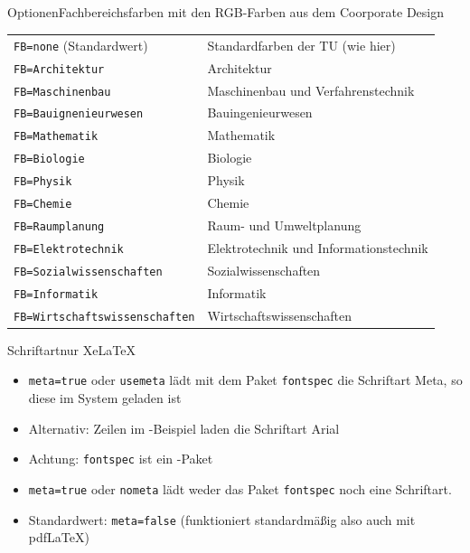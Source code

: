 \documentclass[german,10pt,xcolor=colortbl,compress
]{beamer}
\begin{document}
	\subsection*{}
	\begin{frame}{Optionen}{Fachbereichsfarben mit den RGB-Farben aus dem Coorporate Design}
				\begin{tabular}{ll}
					\toprule
					\lstinline|FB=none| (Standardwert)& Standardfarben der TU (wie hier)\\
					\lstinline|FB=Architektur| & \colorbox{tuklarchitektur}{\color{white}Architektur}\\
					\lstinline|FB=Maschinenbau| & \colorbox{tuklmaschinenbau}{\color{white}Maschinenbau und Verfahrenstechnik}\\
					\lstinline|FB=Bauignenieurwesen| & \colorbox{tuklbauingenieurwesen}{\color{white}Bauingenieurwesen}\\
					\lstinline|FB=Mathematik| & \colorbox{tuklmathematik}{\color{black}Mathematik}\\
					\lstinline|FB=Biologie| & \colorbox{tuklbiologie}{\color{white}Biologie}\\
					\lstinline|FB=Physik| & \colorbox{tuklphysik}{\color{white}Physik}\\
					\lstinline|FB=Chemie| & \colorbox{tuklchemie}{\color{white}Chemie}\\
					\lstinline|FB=Raumplanung| & \colorbox{tuklraumplanung}{\color{white}Raum- und Umweltplanung}\\
					\lstinline|FB=Elektrotechnik| & \colorbox{tuklelektrotechnik}{\color{white}Elektrotechnik und Informationstechnik}\\
					\lstinline|FB=Sozialwissenschaften| & \colorbox{tuklsozialwissenschaften}{\color{white}Sozialwissenschaften}\\
					\lstinline|FB=Informatik| & \colorbox{tuklinformatik}{\color{white}Informatik}\\
					\lstinline|FB=Wirtschaftswissenschaften| & \colorbox{tuklwirtschaftswissenschaften}{\color{white}Wirtschaftswissenschaften}\\
					\bottomrule
				\end{tabular}
	\end{frame}
	\begin{frame}{Schriftart}{nur XeLaTeX}
		\begin{itemize}
			\item \lstinline|meta=true| oder \lstinline|usemeta| lädt mit dem Paket \lstinline|fontspec| die Schriftart Meta, so diese im System geladen ist
			\item Alternativ: Zeilen im \XeLaTeX-Beispiel laden die Schriftart Arial
			\item Achtung: \lstinline|fontspec| ist ein \XeLaTeX-Paket
			\item \lstinline|meta=true| oder \lstinline|nometa| lädt weder das Paket \lstinline|fontspec| noch eine Schriftart.
			\item Standardwert: \lstinline|meta=false| (funktioniert standardmäßig also auch mit pdf\LaTeX)
		\end{itemize}
	\end{frame}
\end{document}
